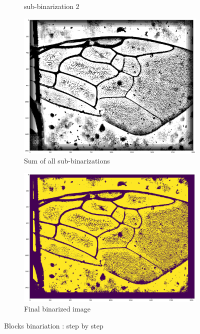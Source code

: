 \documentclass[a4paper]{article}
\begin{document}
\begin{figure}[H]
\begin{subfigure}{.5\textwidth}
    \caption{sub-binarization 2}
\end{subfigure}
\begin{subfigure}{.5\textwidth}
    \centering
    \includegraphics[width=\textwidth]{figures/sum_blocks_bin.png}
    \caption{Sum of all sub-binarizations}
\end{subfigure}
\begin{subfigure}{.5\textwidth}
    \centering
    \includegraphics[width=\textwidth]{figures/blocks.png}
    \caption{Final binarized image}
\end{subfigure}
\caption{Blocks binariation : step by step}
\label{blocks_binarization}
\end{figure}
\end{document}
